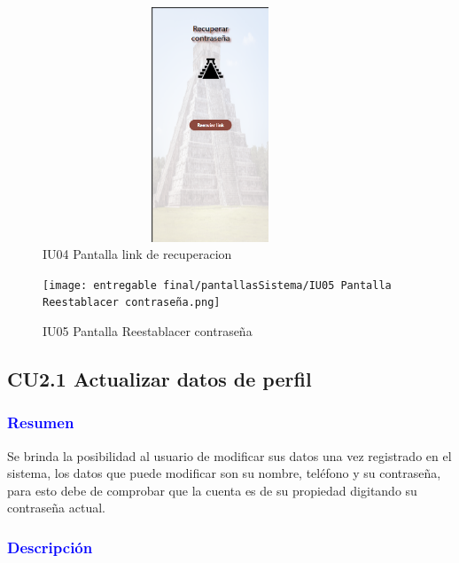     \begin{figure}[htbp]
        \centering
        \includegraphics[width=10cm, height=7cm]{entregable final/pantallasSistema/IU04 Pantalla link de recuperacion.png}
        \caption{IU04 Pantalla link de recuperacion}
        \label{fig:enter-label}
    \end{figure}
    \begin{figure}[htbp]
        \centering
        \texttt{[image: entregable final/pantallasSistema/IU05 Pantalla Reestablacer contraseña.png]}
    \caption{IU05 Pantalla Reestablacer contraseña}
        \label{fig:enter-label}
    \end{figure}

\newpage
\newpage
\newpage
\subsection{CU2.1 Actualizar datos de perfil}

\subsubsection{\textcolor{blue}{Resumen}}
Se brinda la posibilidad al usuario de modificar sus datos una vez registrado en el sistema, los datos que puede modificar son su nombre, teléfono y su contraseña, para esto debe de comprobar que la cuenta es de su propiedad digitando su contraseña actual.
\subsubsection{\textcolor{blue}{Descripción}}

